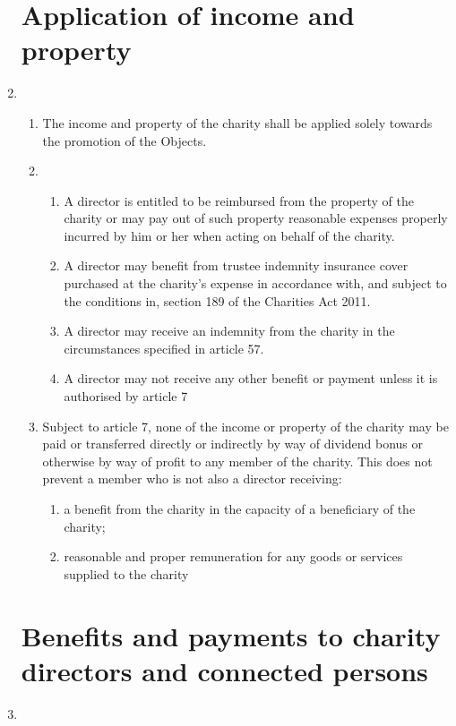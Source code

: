 \documentclass{article}
\begin{document}
\begin{enumerate}[label=\arabic*]
    \section{Application of income and property}
    \item \begin{enumerate}[label=(\arabic*)]
        \item The income and property of the charity shall be applied solely
        towards the promotion of the Objects.
        \item \begin{enumerate}[label=(\alph*)]
            \item A director is entitled to be reimbursed from the property
            of the charity or may pay out of such property reasonable
            expenses properly incurred by him or her when acting on
            behalf of the charity.
            \item A director may benefit from trustee indemnity insurance
            cover purchased at the charity’s expense in accordance
            with, and subject to the conditions in, section 189 of the
            Charities Act 2011.
            \item A director may receive an indemnity from the charity in
            the circumstances specified in article 57.
            \item A director may not receive any other benefit or payment
            unless it is authorised by article 7
        \end{enumerate}
        \item Subject to article 7, none of the income or property of the
        charity may be paid or transferred directly or indirectly by way
        of dividend bonus or otherwise by way of profit to any member
        of the charity. This does not prevent a member who is not also a
        director receiving:
        \begin{enumerate}[label=(\alph*)]
            \item a benefit from the charity in the capacity of a beneficiary
            of the charity;
            \item reasonable and proper remuneration for any goods or
            services supplied to the charity
        \end{enumerate}
    \end{enumerate}
    
    \section{Benefits and payments to charity directors and connected persons}
    \item \begin{enumerate}[label=(\arabic*)]

\end{enumerate}
\end{enumerate}
\end{document}
